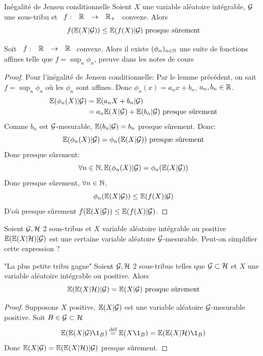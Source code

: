 \documentclass[]{report}
\begin{document}
    \begin{prop}{Inégalité de Jensen conditionnelle}{}
        Soient $X$ une variable aléatoire intégrable, $\mathcal{G}$ une sous-tribu et $\begin{array}{ccccc} f : & \mathbb{R} & \to & \mathbb{R}_+ \end{array}$ convexe. Alors
        \[f(\mathbb{E}(X|\mathcal{G}))\le \mathbb{E}(f(X)|\mathcal{G})\text{ presque sûrement}\]
    \end{prop}

    \begin{lm}{}{}
        Soit $\begin{array}{ccccc} f : & \mathbb{R} & \to & \mathbb{R} \end{array}$ convexe. Alors il existe $(\phi_n)_{n\in\mathbb{N}}$ une suite de fonctions affines telle que $f=\sup_n \phi_n$, preuve dans les notes de cours
    \end{lm}

    \begin{proof}
        Pour l'inégalité de Jensen conditionnelle: Par le lemme précédent, on sait $f=\sup_n \phi_n$ où les $\phi_n$ sont affines. Donc $\phi_n(x)=a_n x+ b_n$, $a_n,b_n\in \mathbb{R}$.
        \begin{align*}
            \mathbb{E}(\phi_n(X)|\mathcal{G})&=\mathbb{E}(a_n X+b_n|\mathcal{G})\\
            &=a_n\mathbb{E}(X|\mathcal{G})+\mathbb{E}(b_n|\mathcal{G})\text{ presque sûrement}
        \end{align*}
        Comme $b_n$ est $\mathcal{G}$-mesurable, $\mathbb{E}(b_n|\mathcal{G})=b_n$ presque sûrement. Donc:
        \[\mathbb{E}(\phi_n(X)|\mathcal{G})=\phi_n(\mathbb{E}(X|\mathcal{G}))\text{ presque sûrement}\]
        Donc presque sûrement:
        \[\forall n\in \mathbb{N},\mathbb{E} (\phi_n(X)|\mathcal{G})=\phi_n(\mathbb{E}(X|\mathcal{G}))\]
        Donc presque sûrement, $\forall n\in \mathbb{N}$,
        \[\phi_n(\mathbb{E}(X|\mathcal{G}))\le \mathbb{E}(f(X)|\mathcal{G})\]
        D'où presque sûrement $f(\mathbb{E}(X|\mathcal{G}))\le \mathbb{E} (f(X)|\mathcal{G})$.
    \end{proof}

    Soient $\mathcal{G}, \mathcal{H}$ 2 sous-tribus et $X$ variable aléatoire intégrable ou positive $\mathbb{E}(\mathbb{E}(X|\mathcal{H})|\mathcal{G})$ est une certaine variable aléatoire $\mathcal{G}$-mesurable. Peut-on simplifier cette expression ?

    \begin{prop}{"La plus petite tribu gagne"}{}
        Soient $\mathcal{G},\mathcal{H}$ 2 sous-tribus telles que $\mathcal{G}\subset \mathcal{H}$ et $X$ une variable aléatoire intégrable ou positive. Alors
        \[\mathbb{E} (\mathbb{E}(X|\mathcal{H})|\mathcal{G})=\mathbb{E}(X|\mathcal{G})\text{ presque sûrement}\]
    \end{prop}

    \begin{proof}
        Supposons $X$ positive, $\mathbb{E}(X|\mathcal{G})$ est une variable aléatoire $\mathcal{G}$-mesurable positive. Soit $B\in \mathcal{G}\subset \mathcal{H}$
        \[\Ea(\Ea(X|\Gr)\1_B)\overset{\text{déf}}{=}\Ea(X\1_B)=\Ea (\Ea(X|\Hr)\1_B)\]
        Donc $\mathbb{E}(X|\mathcal{G})=\mathbb{E}(\mathbb{E}(X|\mathcal{H})|\mathcal{G})$ presque sûrement.
    \end{proof}
\end{document}
